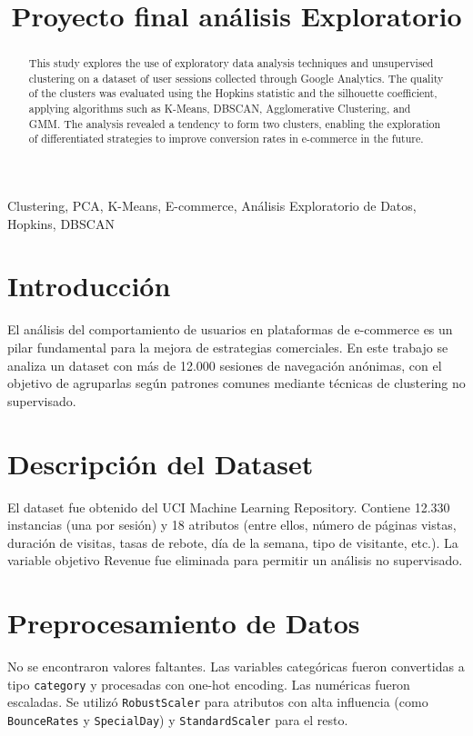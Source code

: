 \documentclass[conference]{IEEEtran}
\title{Proyecto final análisis Exploratorio}
\author{
    \IEEEauthorblockN{Leopoldo Muñoz, Valentina Yáñez}
    \IEEEauthorblockA{
        Universidad de Talca \\
        Facultad de Ingeniería \\
        \texttt{leom18@alumnos.utalca.cl, vyanez20@alumnos.utalca.cl}
    }
}
\begin{document}
\maketitle

\begin{abstract}
This study explores the use of exploratory data analysis techniques and unsupervised clustering on a dataset of user sessions collected through Google Analytics. The quality of the clusters was evaluated using the Hopkins statistic and the silhouette coefficient, applying algorithms such as K-Means, DBSCAN, Agglomerative Clustering, and GMM. The analysis revealed a tendency to form two clusters, enabling the exploration of differentiated strategies to improve conversion rates in e-commerce in the future.
\end{abstract}

\begin{IEEEkeywords}
Clustering, PCA, K-Means, E-commerce, Análisis Exploratorio de Datos, Hopkins, DBSCAN
\end{IEEEkeywords}

\section{Introducción}
El análisis del comportamiento de usuarios en plataformas de e-commerce es un pilar fundamental para la mejora de estrategias comerciales. En este trabajo se analiza un dataset con más de 12.000 sesiones de navegación anónimas, con el objetivo de agruparlas según patrones comunes mediante técnicas de clustering no supervisado.

\section{Descripción del Dataset}
El dataset fue obtenido del UCI Machine Learning Repository. Contiene 12.330 instancias (una por sesión) y 18 atributos (entre ellos, número de páginas vistas, duración de visitas, tasas de rebote, día de la semana, tipo de visitante, etc.). La variable objetivo Revenue fue eliminada para permitir un análisis no supervisado.

\section{Preprocesamiento de Datos}
No se encontraron valores faltantes. Las variables categóricas fueron convertidas a tipo \texttt{category} y procesadas con one-hot encoding. Las numéricas fueron escaladas. Se utilizó \texttt{RobustScaler} para atributos con alta influencia (como \texttt{BounceRates} y \texttt{SpecialDay}) y \texttt{StandardScaler} para el resto.
\end{document}
